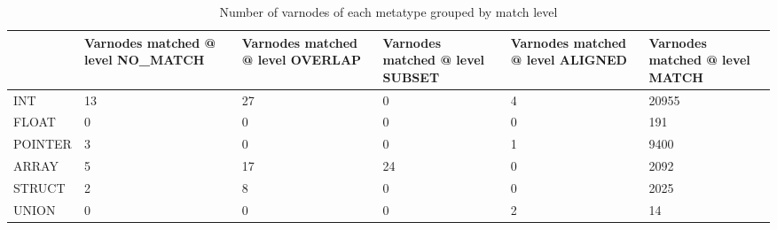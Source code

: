 \begin{table}[t]
\centering
\caption{Number of varnodes of each metatype grouped by match level}
\label{table:metatype-match-levels}
\begin{tabular}{lp{3.6cm}p{3.6cm}p{3.6cm}p{3.6cm}p{3.6cm}}
\toprule
{} &  Varnodes matched @ level NO\_MATCH &  Varnodes matched @ level OVERLAP &  Varnodes matched @ level SUBSET &  Varnodes matched @ level ALIGNED &  Varnodes matched @ level MATCH \\
\midrule
INT     &                                 13 &                                27 &                                0 &                                 4 &                           20955 \\
FLOAT   &                                  0 &                                 0 &                                0 &                                 0 &                             191 \\
POINTER &                                  3 &                                 0 &                                0 &                                 1 &                            9400 \\
ARRAY   &                                  5 &                                17 &                               24 &                                 0 &                            2092 \\
STRUCT  &                                  2 &                                 8 &                                0 &                                 0 &                            2025 \\
UNION   &                                  0 &                                 0 &                                0 &                                 2 &                              14 \\
\bottomrule
\end{tabular}
\end{table}
